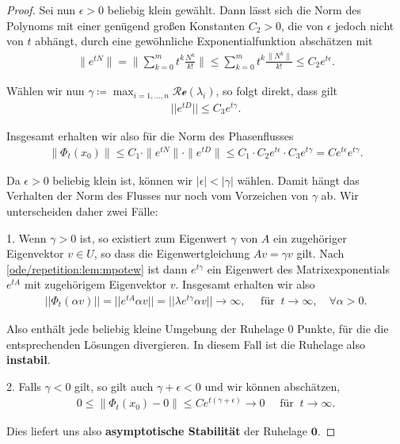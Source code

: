 \documentclass[letterpaper,10pt,german]{jupyterBook}
\begin{document}
\begin{proof}
\par
Sei nun \(\epsilon > 0\) beliebig klein gewählt.
Dann lässt sich die Norm des Polynoms mit einer genügend großen Konstanten \(C_2 > 0\), die von \(\epsilon\) jedoch nicht von \(t\) abhängt, durch eine gewöhnliche Exponentialfunktion abschätzen mit
\begin{align*}
 \|e^{tN}\| = \| \sum_{k=0}^m t^k\frac{N^k}{k!} \| \leq \sum_{k=0}^m t^k \frac{\|N^k\|}{k!} \leq C_2  e^{t \epsilon}.
\end{align*}
\par
Wählen wir nun \(\gamma \coloneqq \max_{i=1,\dots,n} \mathcal{Re}(\lambda_i)\), so folgt direkt, dass gilt
\begin{align*}
||e^{tD}|| \leq C_3 e^{t\gamma}.
\end{align*}
\par
Insgesamt erhalten wir also für die Norm des Phasenflusses
\begin{align}\label{equation:odestability/ruhelagen:eq:abschaetzungew}
\|\Phi_t(x_0)\| \leq C_1 \cdot \|e^{tN}\| \cdot \|e^{tD}\| \leq C_1 \cdot C_2 e^{t \epsilon} \cdot C_3 e^{t\gamma} = C e^{t \epsilon} e^{t\gamma}.
\end{align}
\par
Da \(\epsilon > 0\) beliebig klein ist, können wir \(|\epsilon| < |\gamma|\) wählen.
Damit hängt das Verhalten der Norm des Flusses nur noch vom Vorzeichen von \(\gamma\) ab.
Wir unterscheiden daher zwei Fälle:

\par
1. Wenn \(\gamma >0\) ist, so existiert zum Eigenwert \(\gamma\) von \(A\) ein zugehöriger Eigenvektor \(v\in U\), so dass die Eigenwertgleichung \(A v = \gamma v\) gilt.
Nach \cref{ode/repetition:lem:mpotew} ist dann \(e^{t\gamma}\) ein Eigenwert des Matrixexponentials \(e^{tA}\) mit zugehörigem Eigenvektor \(v\).
Insgesamt erhalten wir also
\begin{align*}
||\Phi_t(\alpha v)|| = ||e^{tA}\alpha v|| = ||\lambda e^{t\gamma} \alpha v|| \to \infty, \quad \text{ für } \ t \to \infty, \quad  \forall \alpha>0.\end{align*}
\par
Also enthält jede beliebig kleine Umgebung der Ruhelage \(0\) Punkte, für die die entsprechenden Lösungen divergieren.
In diesem Fall ist die Ruhelage also \textbf{instabil}.

\par
2. Falls \(\gamma <0\) gilt, so gilt auch \(\gamma + \epsilon <0\) und wir können abschätzen,
\begin{align*}
0\leq \|\Phi_t(x_0)-0\|\leq C e^{t (\gamma + \epsilon)} \to 0 \quad \text{ für } \ t \to \infty.
\end{align*}
\par
Dies liefert uns also \textbf{asymptotische Stabilität} der Ruhelage \(\mathbf{0}\).
\end{proof}
\end{document}
